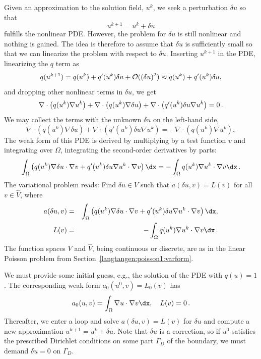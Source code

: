 Given an approximation to the solution field, $u^k$, we seek a
perturbation $\delta u$ so that
\begin{equation}
u^{k+1} = u^k + \delta u
\end{equation}
fulfills the nonlinear PDE. 
However, the problem for $\delta u$ is still nonlinear and nothing is
gained. The idea is therefore to assume that $\delta u$ is sufficiently
small so that we can linearize the problem with respect to $\delta u$.
Inserting $u^{k+1}$ in the PDE,
linearizing the $q$ term as
\begin{equation}
q(u^{k+1}) = q(u^k) + q'(u^k)\delta u + {\cal O}((\delta u)^2)
\approx q(u^k) + q'(u^k)\delta u,
\end{equation}
and dropping other nonlinear terms in $\delta u$,
we get
\[
\nabla\cdot\left( q(u^k)\nabla u^k\right) +
\nabla\cdot\left( q(u^k)\nabla\delta u\right) +
\nabla\cdot\left( q'(u^k)\delta u\nabla u^k\right) = 0\thinspace .
\]
We may collect the terms with the unknown $\delta u$ on the left-hand side,
\begin{equation}
\nabla\cdot\left( q(u^k)\nabla\delta u\right) +
\nabla\cdot\left( q'(u^k)\delta u\nabla u^k\right) = 
-\nabla\cdot\left( q(u^k)\nabla u^k\right),
\end{equation}
The weak form of this PDE is derived by multiplying by a test function $v$
and integrating over $\Omega$, integrating the second-order derivatives
by parts:
\begin{equation}
\int_\Omega \left( 
q(u^k)\nabla\delta u\cdot \nabla v
+ q'(u^k)\delta u\nabla u^k\cdot \nabla v\right)\dx
= -\int_\Omega q(u^k)\nabla u^k\cdot \nabla v\dx\langtangenep
\end{equation}
The variational problem reads: Find $\delta u\in V$ such that
$a(\delta u,v) = L(v)$ for all $v\in \hat V$, where
\begin{eqnarray}
a(\delta u,v) &=& 
\int_\Omega \left( 
q(u^k)\nabla\delta u\cdot \nabla v
+ q'(u^k)\delta u\nabla u^k\cdot \nabla v\right)\dx,
\label{langtangen:nonlinear:poisson:pdelevel:eqa}\\
L(v) &=& -
\int_\Omega q(u^k)\nabla u^k\cdot \nabla v\dx\langtangenep
\label{langtangen:nonlinear:poisson:pdelevel:eqL}
\end{eqnarray}
The function spaces $V$ and $\hat V$, being continuous or discrete,
are as in the
linear Poisson problem from Section~\ref{langtangen:poisson1:varform}.

We must provide some initial guess, e.g., the solution of the
PDE with $q(u)=1$. The corresponding weak form $a_0(u^0,v)=L_0(v)$
has 
\[ a_0(u,v)=\int_\Omega\nabla u\cdot \nabla v\dx,\quad
L(v)=0\langtangenep\]
Thereafter, we enter a loop and solve
$a(\delta u,v)=L(v)$ for $\delta u$ and compute a new approximation
$u^{k+1} = u^k + \delta u$. Note that $\delta u$ is a correction, so if
$u^0$ satisfies the prescribed 
Dirichlet conditions on some part $\Gamma_D$ of the boundary, 
we must demand $\delta u=0$ on $\Gamma_D$.

